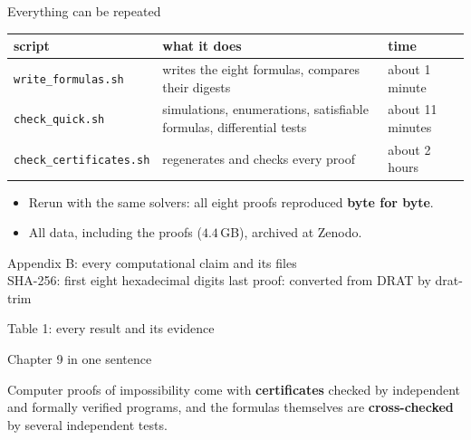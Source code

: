 \begin{frame}{Everything can be repeated}
\renewcommand{\arraystretch}{1.3}\small
\begin{tabular}{@{}l>{\raggedright\arraybackslash}p{6.4cm}l@{}}
\toprule
script & what it does & time\\
\midrule
\texttt{write\_formulas.sh} & writes the eight formulas, compares their digests & about 1 minute\\
\texttt{check\_quick.sh} & simulations, enumerations, satisfiable formulas, differential tests & about 11 minutes\\
\texttt{check\_certificates.sh} & regenerates and checks every proof & about 2 hours\\
\bottomrule
\end{tabular}
\vspace{2ex}
\begin{itemize}
\item Rerun with the same solvers: all eight proofs reproduced \textbf{byte for byte}.
\item All data, including the proofs ($4.4$\,GB), archived at Zenodo.
\end{itemize}
\end{frame}

\begin{frame}{Appendix B: every computational claim and its files}
\centering\fig[0.72]{{\setlength{\textwidth}{1.9\textwidth}\footnotesize\setlength{\tabcolsep}{3pt}}}\\[0.8ex]
\footnotesize SHA-256: first eight hexadecimal digits \quad\textbullet\quad last proof: converted from DRAT by \textsf{drat-trim}
\end{frame}

\begin{frame}{Table 1: every result and its evidence}
\centering{}
\end{frame}

\begin{frame}{Chapter 9 in one sentence}
\vspace{4ex}
\begin{plainbox}\large
Computer proofs of impossibility come with \textbf{certificates} checked by independent and formally verified programs, and the formulas themselves are \textbf{cross-checked} by several independent tests.
\end{plainbox}
\end{frame}

